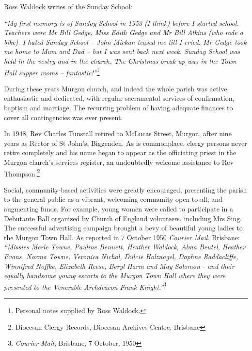 Ross Waldock writes of the Sunday School:



\emph{``My first memory is of Sunday School in 1953 (I think) before I started school. Teachers were Mr Bill Gedge, Miss Edith Gedge and Mr Bill Atkins (who rode a bike). I hated Sunday School -- John Mickan teased me till I cried. Mr Gedge took me home to Mum and Dad -- but I was sent back next week. Sunday School was held in the vestry and in the church. The Christmas break-up was in the Town Hall supper rooms -- fantastic!''}\footnote{Personal notes supplied by Ross Waldock.}


\smallskip


During these years Murgon church, and indeed the whole parish was active, enthusiastic and dedicated, with regular sacramental services of confirmation, baptism and marriage. The recurring problem of having adequate finances to cover all contingencies was ever present.



In 1948, Rev Charles Tunstall retired to McLucas Street, Murgon, after nine years as Rector of St John's, Biggenden. As is commonplace, clergy persons never retire completely and his name began to appear as the officiating priest in the Murgon church's services register, an undoubtedly welcome assistance to Rev Thompson.\footnote{Diocesan Clergy Records, Diocesan Archives Centre, Brisbane}


Social, community-based activities were greatly encouraged, presenting the parish to the general public as a vibrant, welcoming community open to all, and augmenting funds. For example, young women were called to participate in a Debutante Ball organized by Church of England volunteers, including Mrs Sing. The successful advertising campaign brought a bevy of beautiful young ladies to the Murgon Town Hall. As reported in 7 October 1950 \emph{Courier Mail,} Brisbane: \emph{``Missies Merle Towne, Pauline Bennett, Heather Waldock, Alma Beutel, Heather Evans, Norma Towne, Veronica Nichol, Dulcie Holznagel, Daphne Raddacliffe, Winnifred Noffke, Elizabeth Reese, Beryl Harm and May Solomon - and their equally handsome young escorts to the Murgon Town Hall where they were presented to the Venerable Archdeacon Frank Knight.''}\footnote{\emph{Courier Mail,} Brisbane, 7 October, 1950}


